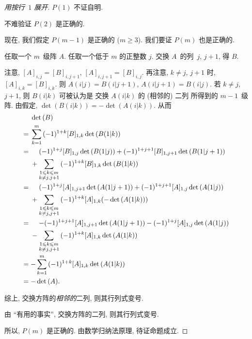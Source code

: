 \begin{proof}[用按行~\(1\) 展开]
    \(P(1)\) 不证自明.

    不难验证 \(P(2)\) 是正确的.

    现在, 我们假定 \(P(m-1)\) 是正确的 (\(m \geq 3\)).
    我们要证 \(P(m)\) 也是正确的.

    任取一个 \(m\)~级阵 \(A\).
    任取一个低于 \(m\) 的正整数 \(j\).
    交换 \(A\)~的列~\(j\), \(j+1\), 得 \(B\).

    注意,
    \([A]_{i,j} = [B]_{i,j+1}\),
    \([A]_{i,j+1} = [B]_{i,j}\).
    再注意, \(k \neq j\), \(j+1\) 时,
    \([A]_{i,k} = [B]_{i,k}\).
    则 \(A(i|j) = B(i|j+1)\),
    \(A(i|j+1) = B(i|j)\).
    若 \(k \neq j\), \(j+1\),
    则 \(B(i|k)\) 可被认为是%
    交换 \(A(i|k)\) 的 (相邻的) 二列%
    所得到的 \(m-1\)~级阵.
    由假定,
    \(\det {(B(i|k))} = -\det {(A(i|k))}\).
    从而
    \begin{align*}
             & \det {(B)}
        \\
        = {} &
        \sum_{k = 1}^{m}
        {(-1)^{1 + k} [B]_{1,k} \det {(B(1|k))}}
        \\
        = {} &
        \hphantom{{} + {}}
        (-1)^{1 + j} [B]_{1,j} \det {(B(1|j))}
        + (-1)^{1 + j+1} [B]_{1,j+1} \det {(B(1|j+1))}
        \\
             & +
        \sum_{\substack{1 \leq k \leq m \\k \neq j, j+1}}
        {(-1)^{1 + k} [B]_{1,k} \det {(B(1|k))}}
        \\
        = {} &
        \hphantom{{} + {}}
        (-1)^{1 + j} [A]_{1,j+1} \det {(A(1|j+1))}
        + (-1)^{1 + j+1} [A]_{1,j} \det {(A(1|j))}
        \\
             & +
        \sum_{\substack{1 \leq k \leq m \\k \neq j, j+1}}
        {(-1)^{1 + k} [A]_{1,k} (-\det {(A(1|k))})}
        \\
        = {} &
        \hphantom{{} + {}}
        {-(-1)^{1 + j+1}} [A]_{1,j+1} \det {(A(1|j+1))}
        - (-1)^{1 + j} [A]_{1,j} \det {(A(1|j))}
        \\
             & -
        \sum_{\substack{1 \leq k \leq m \\k \neq j, j+1}}
        {(-1)^{1 + k} [A]_{1,k} \det {(A(1|k))}}
        \\
        = {} &
        {-\sum_{k = 1}^{m}
        {(-1)^{1 + k} [A]_{1,k} \det {(A(1|k))}}}
        \\
        = {} & {-\det {(A)}}.
    \end{align*}

    综上,
    交换方阵的\emph{相邻的}二列,
    则其行列式变号.

    由 ``有用的事实'',
    交换方阵的二列,
    则其行列式变号.

    所以, \(P(m)\) 是正确的.
    由数学归纳法原理, 待证命题成立.
\end{proof}

